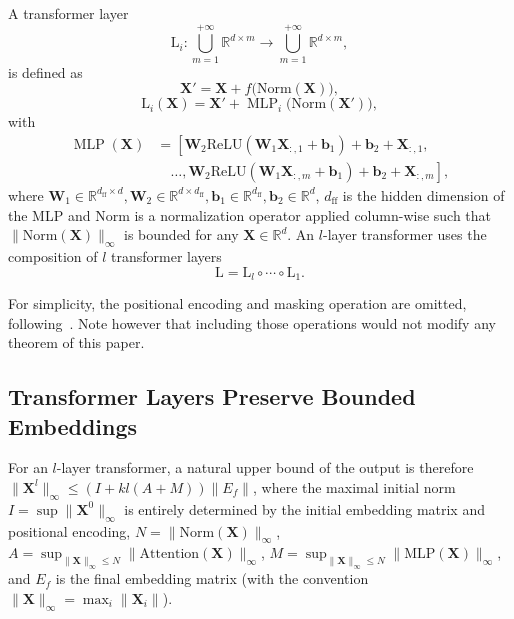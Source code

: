 \begin{definition}
    A transformer layer 
    \[
    \mathrm L_i:\bigcup_{m=1}^{+\infty}\mathbb R^{d\times m}\longrightarrow\bigcup_{m=1}^{+\infty}\mathbb R^{d\times m},
    \]
    is defined as
    $$\mathbf X'=\mathbf{X} + f\big(\mathrm{Norm}(\mathbf{X})\big), $$
    \[\mathrm L_i(\mathbf{X}) = \mathbf X' + \operatorname{MLP}_i\big( \mathrm{Norm}(\mathbf X') \big),\] 
    with
    \begin{align*}
        \operatorname{MLP}(\mathbf{X}) &= \left[\mathbf{W}_2 \mathrm{ReLU}(\mathbf{W}_1 \mathbf{X}_{: , 1} + \mathbf{b}_1) + \mathbf{b}_2 + \mathbf{X}_{: , 1}, \right. \\
        &\quad \left. \ldots, 
        \mathbf{W}_2 \mathrm{ReLU}(\mathbf{W}_1 \mathbf{X}_{: , m} + \mathbf{b}_1) + \mathbf{b}_2+\mathbf{X}_{: , m}\right],
    \end{align*}
    where $\mathbf W_1\in\mathbb R^{d_{\mathrm{ff}}\times d},\mathbf W_2\in\mathbb R^{d\times d_{\mathrm{ff}}},\mathbf b_1\in\mathbb R^{d_{\mathrm{ff}}},\mathbf b_2\in\mathbb R^d$, $d_{\mathrm{ff}}$ is the hidden dimension of the MLP and $\mathrm{Norm}$ is a normalization operator applied column-wise such that $\lVert\mathrm{Norm}(\mathbf X)\rVert_\infty$ is bounded for any $\mathbf X\in\mathbb R^d$.
    An $l$-layer transformer uses the composition of $l$ transformer layers \[\mathrm L=\mathrm L_l \circ \cdots \circ \mathrm L_1.\]
\end{definition}

For simplicity, the positional encoding and masking operation are omitted, following~\citep{Kim_H_2021_p-icml_not-lipshitz}. Note however that including those operations would not modify any theorem of this paper.

\subsection{Transformer Layers Preserve Bounded Embeddings}

For an $l$-layer transformer, a natural upper bound of the output is therefore $\lVert \mathbf X^l\rVert_\infty\leq(I+kl(A+M))\lVert E_f\rVert$, where the maximal initial norm $I=\sup\lVert \mathbf X^0\rVert_\infty$ is entirely determined by the initial embedding matrix and positional encoding, $N=\lVert\mathrm{Norm}(\mathbf X)\rVert_\infty$, $A=\sup_{\lVert \mathbf X\rVert_\infty\leq N}{\lVert\mathrm{Attention}(\mathbf X)\rVert_\infty}$, $M=\sup_{\lVert \mathbf X\rVert_\infty\leq N}{\lVert\mathrm{MLP}(\mathbf X)\rVert_\infty}$, and $E_f$ is the final embedding matrix (with the convention $\lVert \mathbf X\rVert_\infty=\max_{i}\lVert \mathbf X_i\rVert$).

